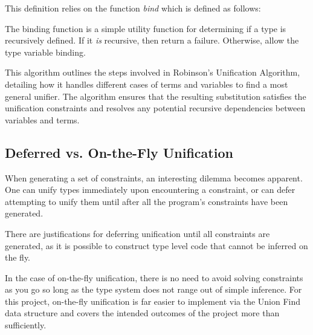 \documentclass{l4proj}
\begin{document}
This definition relies on the function \emph{bind} which is defined as follows:
\begin{center}
\begin{minipage}{0.8\linewidth}%
\begin{algorithm}[H]
    \DontPrintSemicolon
\caption{The binding function is a simple utility function for determining if a type is recursively defined. If it \emph{is} recursive, then return a failure. Otherwise, allow the type variable binding.}
\end{algorithm}
\end{minipage}
\end{center}

This algorithm outlines the steps involved in Robinson's Unification Algorithm, detailing how it handles different cases of terms and variables to find a most general unifier.
The algorithm ensures that the resulting substitution satisfies the unification constraints and resolves any potential recursive dependencies between variables and terms.

\subsection*{Deferred vs. On-the-Fly Unification}

When generating a set of constraints, an interesting dilemma becomes apparent.
One can unify types immediately upon encountering a constraint, or can defer attempting to unify them until after all the program's constraints have been generated.

There are justifications for deferring unification until all constraints are generated, as it is possible to construct type level code that cannot be inferred on the fly.

In the case of on-the-fly unification, there is no need to avoid solving constraints as you go so long as the type system does not range out of simple inference.
For this project, on-the-fly unification is far easier to implement via the Union Find data structure and covers the intended outcomes of the project more than sufficiently.

\end{document}
